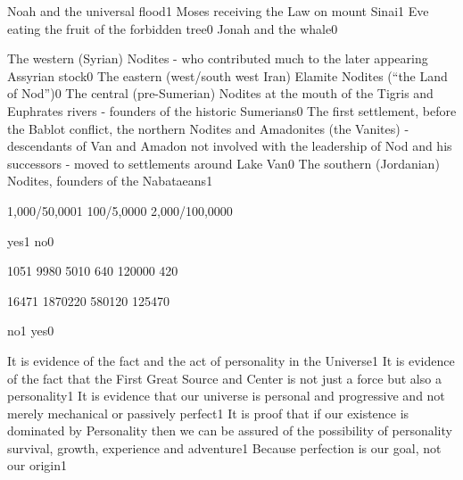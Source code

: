 {Noah and the universal flood}{1}
{Moses receiving the Law on mount Sinai}{1}
{Eve eating the fruit of the forbidden tree}{0}
{Jonah and the whale}{0}
\qstop

{The western (Syrian) Nodites - who contributed much to the later appearing Assyrian stock}{0}
{The eastern (west/south west Iran) Elamite Nodites (``the Land of Nod'')}{0}
{The central (pre-Sumerian) Nodites at the mouth of the Tigris and Euphrates rivers - founders of the historic Sumerians}{0}
{The first settlement, before the Bablot conflict, the northern Nodites and Amadonites (the Vanites) - descendants of Van and Amadon not involved with the leadership of Nod and his successors - moved to settlements around Lake Van}{0}
{The southern (Jordanian) Nodites, founders of the Nabataeans}{1}
\qstop

{1,000/50,000}{1}
{100/5,000}{0}
{2,000/100,000}{0}
\qstop

{yes}{1}
{no}{0}
\qstop

{105}{1}
{998}{0}
{501}{0}
{64}{0}
{12000}{0}
{42}{0}
\qstop

{1647}{1}
{187022}{0}
{58012}{0}
{12547}{0}
\qstop

{no}{1}
{yes}{0}
\qstop

{It is evidence of the fact and the act of personality in the Universe}{1}
{It is evidence of the fact that the First Great Source and Center is not just a force but also a personality}{1}
{It is evidence that our universe is personal and progressive and not merely mechanical or passively perfect}{1}
{It is proof that if our existence is dominated by Personality then we can be assured of the possibility of personality survival, growth, experience and adventure}{1}
{Because perfection is our goal, not our origin}{1}
\qstop

